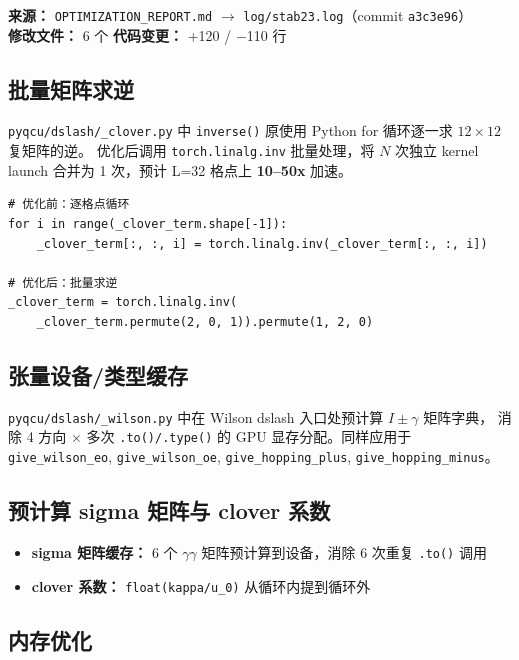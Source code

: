 \documentclass[11pt,a4paper]{article}
\begin{document}
\textbf{来源：} \texttt{OPTIMIZATION\_REPORT.md} $\rightarrow$ \texttt{log/stab23.log}（commit \texttt{a3c3e96}）\\
\textbf{修改文件：} 6 个 \quad \textbf{代码变更：} +120 / $-$110 行

\subsection{批量矩阵求逆}

\texttt{pyqcu/dslash/\_clover.py} 中 \texttt{inverse()} 原使用 Python for 循环逐一求 $12\times12$ 复矩阵的逆。
优化后调用 \texttt{torch.linalg.inv} 批量处理，将 $N$ 次独立 kernel launch 合并为 1 次，预计 L=32 格点上 \textbf{10--50x} 加速。

\begin{lstlisting}[style=pythonstyle]
# 优化前：逐格点循环
for i in range(_clover_term.shape[-1]):
    _clover_term[:, :, i] = torch.linalg.inv(_clover_term[:, :, i])

# 优化后：批量求逆
_clover_term = torch.linalg.inv(
    _clover_term.permute(2, 0, 1)).permute(1, 2, 0)
\end{lstlisting}

\subsection{张量设备/类型缓存}

\texttt{pyqcu/dslash/\_wilson.py} 中在 Wilson dslash 入口处预计算 $I \pm \gamma$ 矩阵字典，
消除 4 方向 $\times$ 多次 \texttt{.to()/.type()} 的 GPU 显存分配。同样应用于
\texttt{give\_wilson\_eo}, \texttt{give\_wilson\_oe}, \texttt{give\_hopping\_plus}, \texttt{give\_hopping\_minus}。

\subsection{预计算 sigma 矩阵与 clover 系数}

\begin{itemize}
    \item \textbf{sigma 矩阵缓存：} 6 个 $\gamma\gamma$ 矩阵预计算到设备，消除 6 次重复 \texttt{.to()} 调用
    \item \textbf{clover 系数：} \texttt{float(kappa/u\_0)} 从循环内提到循环外
\end{itemize}

\subsection{内存优化}
\end{document}
